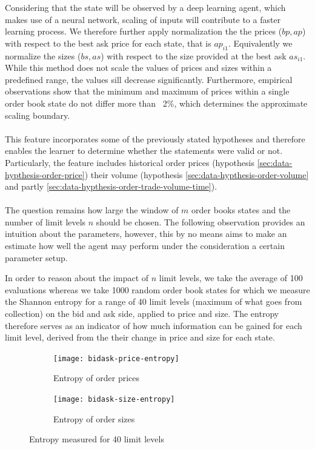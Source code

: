 Considering that the state will be observed by a deep learning agent, which makes use of a neural network, scaling of inputs will contribute to a faster learning process.
We therefore further apply normalization the the prices ($bp, ap$) with respect to the best ask price for each state, that is $ap_{i1}$.
Equivalently we normalize the sizes ($bs, as$) with respect to the size provided at the best ask $as_{i1}$.
While this method does not scale the values of prices and sizes within a predefined range, the values sill decrease significantly.
Furthermore, empirical observations show that the minimum and maximum of prices within a single order book state do not differ more than ~2\%, which determines the approximate scaling boundary.
\\
\\
This feature incorporates some of the previously stated hypotheses and therefore enables the learner to determine whether the statements were valid or not.
Particularly, the feature includes historical order prices (hypothesis \ref{sec:data-hypthesis-order-price}) their volume (hypothesis \ref{sec:data-hypthesis-order-volume} and partly \ref{sec:data-hypthesis-order-trade-volume-time}).
\\
\\
The question remains how large the window of $m$ order books states and the number of limit levels $n$ should be chosen.
The following observation provides an intuition about the parameters, however, this by no means aims to make an estimate how well the agent may perform under the consideration a certain parameter setup.

In order to reason about the impact of $n$ limit levels, we take the average of 100 evaluations whereas we take 1000 random order book states for which we measure the Shannon entropy\cite{shannon2001mathematical} for a range of 40 limit levels (maximum of what goes from collection) on the bid and ask side, applied to price and size.
The entropy therefore serves as an indicator of how much information can be gained for each limit level, derived from the their change in price and size for each state.

\begin{figure}[H]
    \centering
    \begin{subfigure}[b]{0.45\textwidth}
        \texttt{[image: bidask-price-entropy]}
        \caption{Entropy of order prices}
        \label{fig:bidask-price-entropy}
    \end{subfigure}
    \begin{subfigure}[b]{0.45\textwidth}
        \texttt{[image: bidask-size-entropy]}
        \caption{Entropy of order sizes}
        \label{fig:bidask-size-entropy}
    \end{subfigure}
    \caption{Entropy measured for 40 limit levels}\label{fig:bidask-entropy}
\end{figure}

